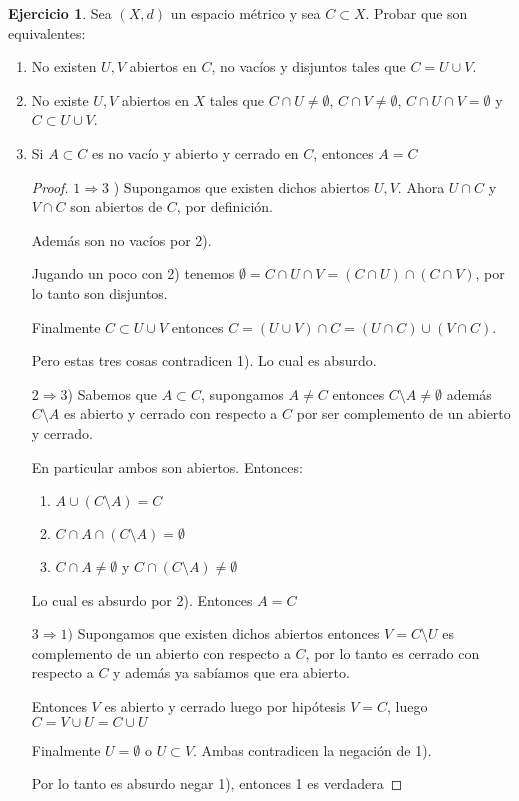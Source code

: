 \documentclass[11pt]{report}
\newcommand{\Ra}{\Rightarrow}
\theoremstyle{definition}
\newtheorem{ej}{Ejercicio}
\begin{document}
\begin{ej}
	Sea $(X,d)$ un espacio métrico y sea $C\subset X$. Probar que son equivalentes:
\begin{enumerate}
	\item No existen $U,V$ abiertos en $C$, no vacíos y disjuntos tales que $C = U \cup V$.
	\item No existe $U,V$ abiertos en $X$ tales que $C \cap U \neq \emptyset$, $C \cap V \neq \emptyset$, $C \cap U \cap V = \emptyset$ y $C \subset U \cup V$.
	\item Si $A \subset C$ es no vacío y abierto y cerrado en $C$, entonces $A = C$

		\begin{proof}
		$1 \Ra 3$ ) Supongamos que existen dichos abiertos $U,V$. Ahora $U \cap C$ y $V \cap C$ son abiertos de $C$, por definición.

Además son no vacíos por 2). 

Jugando un poco con 2) tenemos $\emptyset = C \cap U \cap V = (C \cap U) \cap (C \cap V)$, por lo tanto son disjuntos.

Finalmente $C \subset U \cup V$ entonces $C = (U \cup V ) \cap C = (U \cap C) \cup (V \cap C)$.

Pero estas tres cosas contradicen 1). Lo cual es absurdo.

		$2 \Ra 3$) Sabemos que $A \subset C$, supongamos $A \neq C$ entonces $C \setminus A \neq \emptyset$ además $C \setminus A$ es abierto y cerrado con respecto a $C$ por ser complemento de un abierto y cerrado. 

		En particular ambos son abiertos. Entonces:
		\begin{enumerate}
			\item $A \cup ( C \setminus A ) = C$ 
			\item $C \cap A \cap (C \setminus A) = \emptyset $ 
			\item $C \cap A \neq \emptyset$ y $C \cap (C \setminus A) \neq \emptyset$

		\end{enumerate}		
	Lo cual es absurdo por 2). Entonces $A = C$

$3 \Ra 1)$ Supongamos que existen dichos abiertos entonces $V = C \setminus U $ es complemento de un abierto con respecto a $C$, por lo tanto es cerrado con respecto a $C$ y además ya sabíamos que era abierto.

Entonces $V$ es abierto y cerrado luego por hipótesis $V = C$, luego $C = V \cup U = C \cup U$

Finalmente $U = \emptyset$ o $U \subset V$. Ambas contradicen la negación de 1).

Por lo tanto es absurdo negar 1), entonces 1 es verdadera
		\end{proof}
\end{enumerate}
\end{ej}
\end{document}
